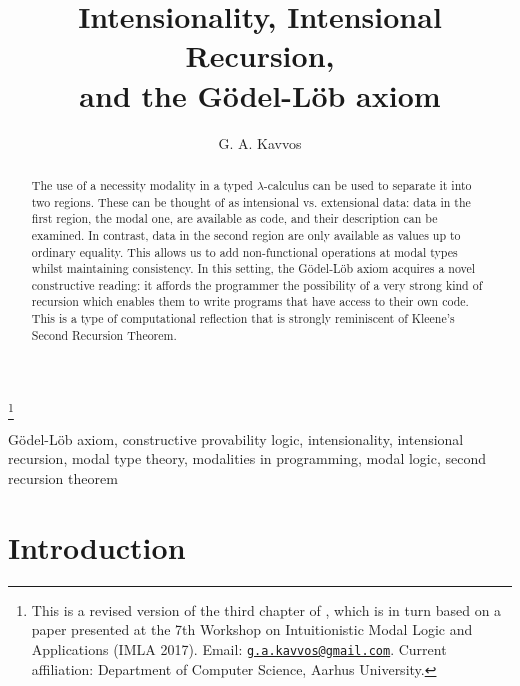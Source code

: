 \documentclass[11pt]{entcs}
\begin{document}
\begin{frontmatter}

\title{Intensionality, Intensional Recursion, \\
  and the G\"odel-L\"ob axiom}

\thanks[myemail]{This is a revised version of the third chapter of
  \cite{Kavvos2017}, which is in turn based on a paper presented at
  the 7th Workshop on Intuitionistic Modal Logic and Applications
  (IMLA 2017). Email: \href{mailto:g.a.kavvos@gmail.com}
  {\texttt{\normalshape g.a.kavvos@gmail.com}}. Current
  affiliation: Department of Computer Science, Aarhus University.}

\author{G. A. Kavvos}

\address{Department of Computer Science \\
  University of Oxford\\
  Oxford, United Kingdom}

\begin{abstract}
  The use of a necessity modality in a typed $\lambda$-calculus
  can be used to separate it into two regions. These can be
  thought of as intensional vs. extensional data: data in the
  first region, the modal one, are available as code, and their
  description can be examined. In contrast, data in the second
  region are only available as values up to ordinary equality.
  This allows us to add non-functional operations at modal types
  whilst maintaining consistency. In this setting, the
  G\"odel-L\"ob axiom acquires a novel constructive reading: it
  affords the programmer the possibility of a very strong kind of
  recursion which enables them to write programs that have access
  to their own code. This is a type of computational reflection
  that is strongly reminiscent of Kleene's Second Recursion
  Theorem.
\end{abstract}

\begin{keyword}
  G\"odel-L\"ob axiom, constructive provability logic, intensionality,
  intensional recursion, modal type theory, modalities in
  programming, modal logic, second recursion theorem
\end{keyword}

\end{frontmatter}


\section{Introduction}
\end{document}
